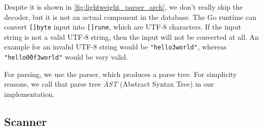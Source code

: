 Despite it is shown in \ref{fig:lightweight_parser_arch}, we don't really skip the decoder, but it is not an actual component in the database.
The Go runtime can convert \texttt{[]byte} input into \texttt{[]rune}, which are UTF-8 characters.
If the input string is not a valid UTF-8 string, then the input will not be converted at all.
An example for an invalid UTF-8 string would be \texttt{"hello\xf3world"}, whereas \texttt{"hello\u00f3world"} would be very valid.

For parsing, we use the parser, which produces a parse tree.
For simplicity reasons, we call that parse tree \textit{AST} (Abstract Syntax Tree) in our implementation.

\subsection{Scanner}
\label{sec:scanner}